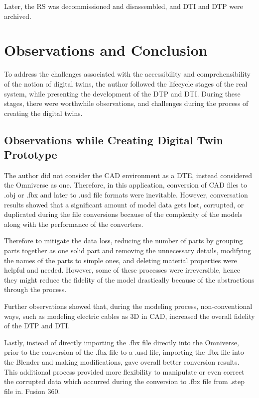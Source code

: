 \documentclass[conference]{IEEEtran}
\begin{document}
    Later, the RS was decommissioned and disassembled, and DTI and DTP were archived.     

    \section{Observations and Conclusion} 

    To address the challenges associated with the accessibility and comprehensibility of the notion of digital twins, the author followed the lifecycle stages of the real system, 
    while presenting the development of the DTP and DTI. During these stages, there were worthwhile observations, and challenges during the process of creating the digital twins.     

    \subsection{Observations while Creating Digital Twin Prototype}

    The author did not consider the CAD environment as a DTE, instead considered the Omniverse as one. Therefore, in this application, conversion of CAD files to .obj or .fbx and later to .usd file formats were 
    inevitable. However, conversation results showed that a significant amount of model data gets lost, corrupted, or duplicated during the file conversions because of the complexity of the models along with the performance of the converters.

    Therefore to mitigate the data loss, reducing the number of parts by grouping parts together as one solid part and removing the unnecessary details,
    modifying the names of the parts to simple ones, and deleting material properties were helpful and needed. However, some of these processes were irreversible, 
    hence they might reduce the fidelity of the model drastically because of the abstractions through the process.

    Further observations showed that, during the modeling process, non-conventional ways, such as modeling electric cables as 3D in CAD, increased the 
    overall fidelity of the DTP and DTI.

    Lastly, instead of directly importing the .fbx file directly into the Omniverse, prior to the conversion of the .fbx file to a .usd file, 
    importing the .fbx file into the Blender and making modifications, gave overall better conversion results. This additional process provided more flexibility to manipulate or even correct 
    the corrupted data which occurred during the conversion to .fbx file from .step file in. Fusion 360.
\end{document}
